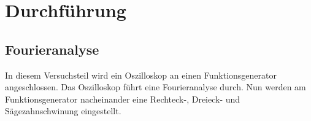 \section{Durchführung}
\label{sec:Durchführung}



\subsection{Fourieranalyse}

In diesem Versuchsteil wird ein Oszilloskop an einen Funktionsgenerator angeschlossen. Das Oszilloskop führt eine Fourieranalyse durch.
Nun werden am Funktionsgenerator nacheinander eine Rechteck-, Dreieck- und Sägezahnschwinung eingestellt.